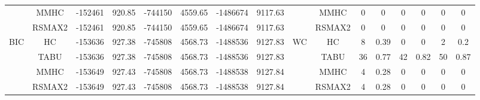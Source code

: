 \begin{table}[p]
{\begin{tabular}{cc||cc|cc|cc||cc|cc|cc|cc}
& MMHC &	-152461 & 	920.85 & 	-744150 & 	4559.65 & 	-1486674 & 	9117.63 & 	& MMHC &	0 & 	0 & 	0 & 	0 & 	0 & 	0\tabularnewline													
& RSMAX2 &	-152461 & 	920.85 & 	-744150 & 	4559.65 & 	-1486674 & 	9117.63 & 	& RSMAX2 &	0 & 	0 & 	0 & 	0 & 	0 & 	0\tabularnewline													
\hline																										
\multirow{4}{*}{BIC} & HC &	-153636 & 	927.38 & 	-745808 & 	4568.73 & 	-1488536 & 	9127.83 & 	\multirow{4}{*}{WC} & HC &	8 & 	0.39 & 	0 & 	0 & 	2 & 	0.2\tabularnewline													
& TABU &	-153636 & 	927.38 & 	-745808 & 	4568.73 & 	-1488536 & 	9127.83 & 	& TABU &	36 & 	0.77 & 	42 & 	0.82 & 	50 & 	0.87\tabularnewline													
& MMHC &	-153649 & 	927.43 & 	-745808 & 	4568.73 & 	-1488538 & 	9127.84 & 	& MMHC &	4 & 	0.28 & 	0 & 	0 & 	0 & 	0\tabularnewline													
& RSMAX2 &	-153649 & 	927.43 & 	-745808 & 	4568.73 & 	-1488538 & 	9127.84 & 	& RSMAX2 &	4 & 	0.28 & 	0 & 	0 & 	0 & 	0\tabularnewline													
\hline																										
\end{tabular}																										
}																										
\end{table}																										


